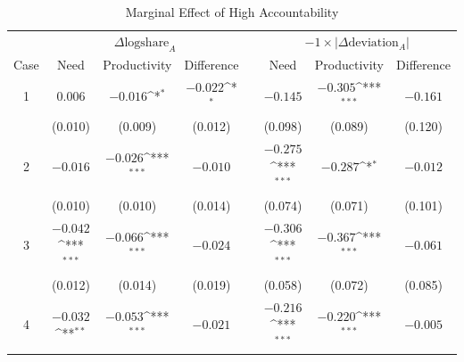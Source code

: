 \documentclass[smallcondensed]{svjour3}
\begin{document}
%
\clearpage
%
\begin{table}[ht]
\centering
\caption{Marginal Effect of High Accountability}\label{tab:marginalaccount}
{\footnotesize
\def\sym#1{\ifmmode^{#1}\else\(^{#1}\)\fi}
\begin{tabular}{cccccccc}\\[0.5ex]\hline
                               & \multicolumn{3}{c}{$\Delta\mbox{logshare}_A$}                                                    &   & \multicolumn{3}{c}{$-1\times|\Delta\mbox{deviation}_A|$}                                         \\\cline{2-4}\cline{6-8}
   \multicolumn{1}{c}{Case}    & \multicolumn{1}{c}{Need}   & \multicolumn{1}{c}{Productivity} & \multicolumn{1}{c}{Difference}   &   & \multicolumn{1}{c}{Need} & \multicolumn{1}{c}{Productivity}   & \multicolumn{1}{c}{Difference}   \\\hline\hline
   1                           &  $0.006$                   & $-0.016$\sym{*}                  & $-0.022$\sym{*}                  &   & $-0.145$                 & $-0.305$\sym{***}                  & $-0.161$                         \\
                               &  (0.010)                   &  (0.009)                         &  (0.012)                         &   &  (0.098)                 &  (0.089)                           &  (0.120)                         \\
   2                           & $-0.016$                   & $-0.026$\sym{***}                & $-0.010$                         &   & $-0.275$\sym{***}        & $-0.287$\sym{*}                    & $-0.012$                         \\
                               &  (0.010)                   &  (0.010)                         &  (0.014)                         &   &  (0.074)                 &  (0.071)                           &  (0.101)                         \\
   3                           & $-0.042$\sym{***}          & $-0.066$\sym{***}                & $-0.024$                         &   & $-0.306$\sym{***}        & $-0.367$\sym{***}                  & $-0.061$                         \\
                               &  (0.012)                   &  (0.014)                         &  (0.019)                         &   &  (0.058)                 &  (0.072)                           &  (0.085)                         \\
   4                           & $-0.032$\sym{**}           & $-0.053$\sym{***}                & $-0.021$                         &   & $-0.216$\sym{***}        & $-0.220$\sym{***}                  & $-0.005$                         \\

\end{tabular}}
\end{table}
\end{document}
